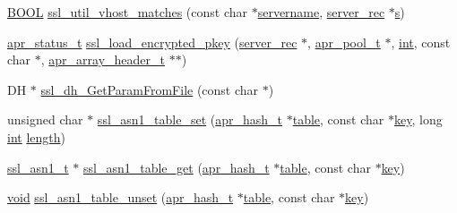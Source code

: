 \begin{DoxyCompactItemize}
\item 
\hyperlink{pcre__internal_8h_a050c65e107f0c828f856a231f4b4e788}{B\+O\+OL} \hyperlink{group__MOD__SSL__PRIVATE_ga677f0129945882342653cb3037ee9314}{ssl\+\_\+util\+\_\+vhost\+\_\+matches} (const char $\ast$\hyperlink{ab_8c_aa565cc2c00e3eee2c93c18e1aaf6cb6a}{servername}, \hyperlink{structserver__rec}{server\+\_\+rec} $\ast$\hyperlink{pcretest_8txt_a062597889ba244b72877454b1d3adecf}{s})
\item 
\hyperlink{group__apr__errno_gaa5105fa83cc322f09382292db8b47593}{apr\+\_\+status\+\_\+t} \hyperlink{group__MOD__SSL__PRIVATE_ga594145a68cd4bcdddfcee86210599d73}{ssl\+\_\+load\+\_\+encrypted\+\_\+pkey} (\hyperlink{structserver__rec}{server\+\_\+rec} $\ast$, \hyperlink{structapr__pool__t}{apr\+\_\+pool\+\_\+t} $\ast$, \hyperlink{pcre_8txt_a42dfa4ff673c82d8efe7144098fbc198}{int}, const char $\ast$, \hyperlink{structapr__array__header__t}{apr\+\_\+array\+\_\+header\+\_\+t} $\ast$$\ast$)
\item 
DH $\ast$ \hyperlink{group__MOD__SSL__PRIVATE_gaaa6c71330e1e83f0fb7127a40bf4e3e7}{ssl\+\_\+dh\+\_\+\+Get\+Param\+From\+File} (const char $\ast$)
\item 
unsigned char $\ast$ \hyperlink{group__MOD__SSL__PRIVATE_ga4504251e36120aa24b691d877268e323}{ssl\+\_\+asn1\+\_\+table\+\_\+set} (\hyperlink{structapr__hash__t}{apr\+\_\+hash\+\_\+t} $\ast$\hyperlink{group__APACHE__CORE__SCRIPT_ga354a8f67383593e40ef4d649a6b47773}{table}, const char $\ast$\hyperlink{apr__siphash_8h_adac0b6a30345ea1d0daa8a692b0b7ad9}{key}, long \hyperlink{pcre_8txt_a42dfa4ff673c82d8efe7144098fbc198}{int} \hyperlink{pcregrep_8txt_ac76ee5ca1111cbb38887e0d698e8ea08}{length})
\item 
\hyperlink{structssl__asn1__t}{ssl\+\_\+asn1\+\_\+t} $\ast$ \hyperlink{group__MOD__SSL__PRIVATE_ga51df44abeb791f6d84a4b2d0391b7ccb}{ssl\+\_\+asn1\+\_\+table\+\_\+get} (\hyperlink{structapr__hash__t}{apr\+\_\+hash\+\_\+t} $\ast$\hyperlink{group__APACHE__CORE__SCRIPT_ga354a8f67383593e40ef4d649a6b47773}{table}, const char $\ast$\hyperlink{apr__siphash_8h_adac0b6a30345ea1d0daa8a692b0b7ad9}{key})
\item 
\hyperlink{group__MOD__ISAPI_gacd6cdbf73df3d9eed42fa493d9b621a6}{void} \hyperlink{group__MOD__SSL__PRIVATE_ga972e87f81ab1284799009ada4b0c747e}{ssl\+\_\+asn1\+\_\+table\+\_\+unset} (\hyperlink{structapr__hash__t}{apr\+\_\+hash\+\_\+t} $\ast$\hyperlink{group__APACHE__CORE__SCRIPT_ga354a8f67383593e40ef4d649a6b47773}{table}, const char $\ast$\hyperlink{apr__siphash_8h_adac0b6a30345ea1d0daa8a692b0b7ad9}{key})
\item 
$$
\end{DoxyCompactItemize}

